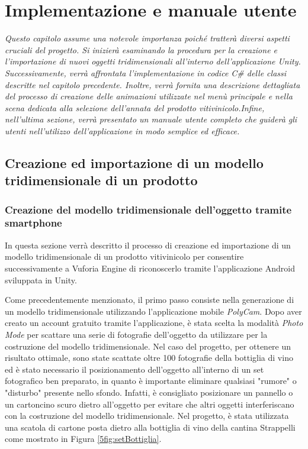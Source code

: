 \chapter{Implementazione e manuale utente}

\begin{preamble}
{\em Questo capitolo assume una notevole importanza poiché tratterà diversi aspetti cruciali del progetto. Si inizierà esaminando la procedura per la creazione e l'importazione di nuovi oggetti tridimensionali all'interno dell'applicazione Unity. \newline \indent Successivamente, verrà affrontata l'implementazione in codice C\# delle classi descritte nel capitolo precedente. Inoltre, verrà fornita una descrizione dettagliata del processo di creazione delle animazioni utilizzate nel menù principale e nella scena dedicata alla selezione dell'annata del prodotto vitivinicolo.\newline \indent Infine, nell'ultima sezione, verrà presentato un manuale utente completo che guiderà gli utenti nell'utilizzo dell'applicazione in modo semplice ed efficace.}
\end{preamble}

\section{Creazione ed importazione di un modello tridimensionale di un prodotto}
\subsection{Creazione del modello tridimensionale dell'oggetto tramite smartphone}

In questa sezione verrà descritto il processo di creazione ed importazione di un modello tridimensionale di un prodotto vitivinicolo per consentire successivamente a Vuforia Engine di riconoscerlo tramite l'applicazione Android sviluppata in Unity.

Come precedentemente menzionato, il primo passo consiste nella generazione di un modello tridimensionale utilizzando l'applicazione mobile \textit{PolyCam}. Dopo aver creato un account gratuito tramite l'applicazione, è stata scelta la modalità \textit{Photo Mode} per scattare una serie di fotografie dell'oggetto da utilizzare per la costruzione del modello tridimensionale. Nel caso del progetto, per ottenere un risultato ottimale, sono state scattate oltre 100 fotografie della bottiglia di vino ed è stato necessario il posizionamento dell'oggetto all'interno di un set fotografico ben preparato, in quanto è importante eliminare qualsiasi "rumore" o "disturbo" presente nello sfondo. Infatti, è consigliato posizionare un pannello o un cartoncino scuro dietro all'oggetto per evitare che altri oggetti interferiscano con la costruzione del modello tridimensionale. Nel progetto, è stata utilizzata una scatola di cartone posta dietro alla bottiglia di vino della cantina Strappelli come mostrato in Figura \ref{5fig:setBottiglia}.

